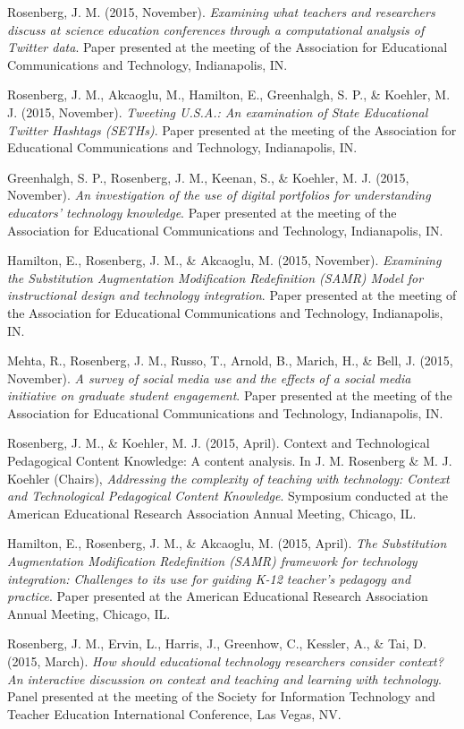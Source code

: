 \documentclass[]{article}
\begin{document}
Rosenberg, J. M. (2015, November). \emph{Examining what teachers and
researchers discuss at science education conferences through a
computational analysis of Twitter data}. Paper presented at the meeting
of the Association for Educational Communications and Technology,
Indianapolis, IN.

Rosenberg, J. M., Akcaoglu, M., Hamilton, E., Greenhalgh, S. P., \&
Koehler, M. J. (2015, November). \emph{Tweeting U.S.A.: An examination
of State Educational Twitter Hashtags (SETHs)}. Paper presented at the
meeting of the Association for Educational Communications and
Technology, Indianapolis, IN.

Greenhalgh, S. P., Rosenberg, J. M., Keenan, S., \& Koehler, M. J.
(2015, November). \emph{An investigation of the use of digital
portfolios for understanding educators' technology knowledge}. Paper
presented at the meeting of the Association for Educational
Communications and Technology, Indianapolis, IN.

Hamilton, E., Rosenberg, J. M., \& Akcaoglu, M. (2015, November).
\emph{Examining the Substitution Augmentation Modification Redefinition
(SAMR) Model for instructional design and technology integration}. Paper
presented at the meeting of the Association for Educational
Communications and Technology, Indianapolis, IN.

Mehta, R., Rosenberg, J. M., Russo, T., Arnold, B., Marich, H., \& Bell,
J. (2015, November). \emph{A survey of social media use and the effects
of a social media initiative on graduate student engagement}. Paper
presented at the meeting of the Association for Educational
Communications and Technology, Indianapolis, IN.

Rosenberg, J. M., \& Koehler, M. J. (2015, April). Context and
Technological Pedagogical Content Knowledge: A content analysis. In J.
M. Rosenberg \& M. J. Koehler (Chairs), \emph{Addressing the complexity
of teaching with technology: Context and Technological Pedagogical
Content Knowledge}. Symposium conducted at the American Educational
Research Association Annual Meeting, Chicago, IL.

Hamilton, E., Rosenberg, J. M., \& Akcaoglu, M. (2015, April). \emph{The
Substitution Augmentation Modification Redefinition (SAMR) framework for
technology integration: Challenges to its use for guiding K-12 teacher's
pedagogy and practice}. Paper presented at the American Educational
Research Association Annual Meeting, Chicago, IL.

Rosenberg, J. M., Ervin, L., Harris, J., Greenhow, C., Kessler, A., \&
Tai, D. (2015, March). \emph{How should educational technology
researchers consider context? An interactive discussion on context and
teaching and learning with technology}. Panel presented at the meeting
of the Society for Information Technology and Teacher Education
International Conference, Las Vegas, NV.
\end{document}
